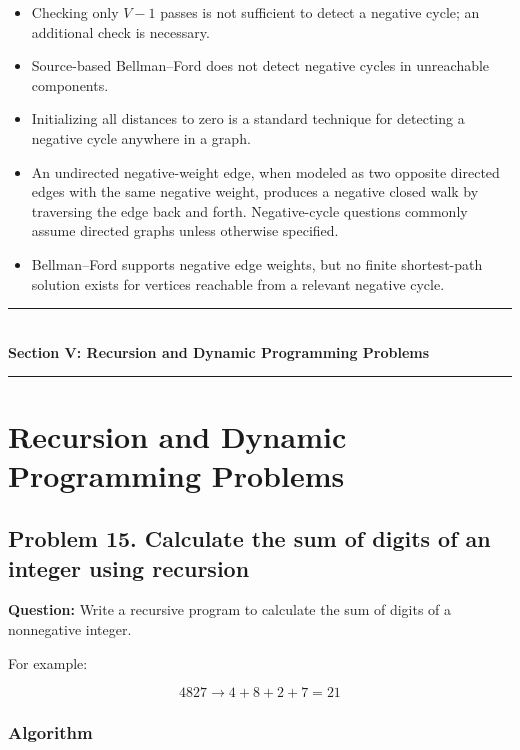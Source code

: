 \begin{itemize}
    \item Checking only $V-1$ passes is not sufficient to detect a negative cycle; an additional check is necessary.
    \item Source-based Bellman--Ford does not detect negative cycles in unreachable components.
    \item Initializing all distances to zero is a standard technique for detecting a negative cycle anywhere in a graph.
    \item An undirected negative-weight edge, when modeled as two opposite directed edges with the same negative weight, produces a negative closed walk by traversing the edge back and forth. Negative-cycle questions commonly assume directed graphs unless otherwise specified.
    \item Bellman--Ford supports negative edge weights, but no finite shortest-path solution exists for vertices reachable from a relevant negative cycle.
\end{itemize}


\newpage
\begin{center}
\vspace{0.5em}
{\color{primary}\rule{0.45\textwidth}{1.2pt}}\\[4pt]
{\Large\bfseries\color{primary} Section V: Recursion and Dynamic Programming Problems}\\[2pt]
{\color{primary}\rule{0.45\textwidth}{1.2pt}}
\vspace{0.5em}
\end{center}

\section{Recursion and Dynamic Programming Problems}


\subsection{Problem 15. Calculate the sum of digits of an integer using recursion}

\textbf{Question:} Write a recursive program to calculate the sum of digits of a nonnegative integer.

For example:


\[
4827\rightarrow4+8+2+7=\boxed{21}
\]


\subsubsection{Algorithm}

